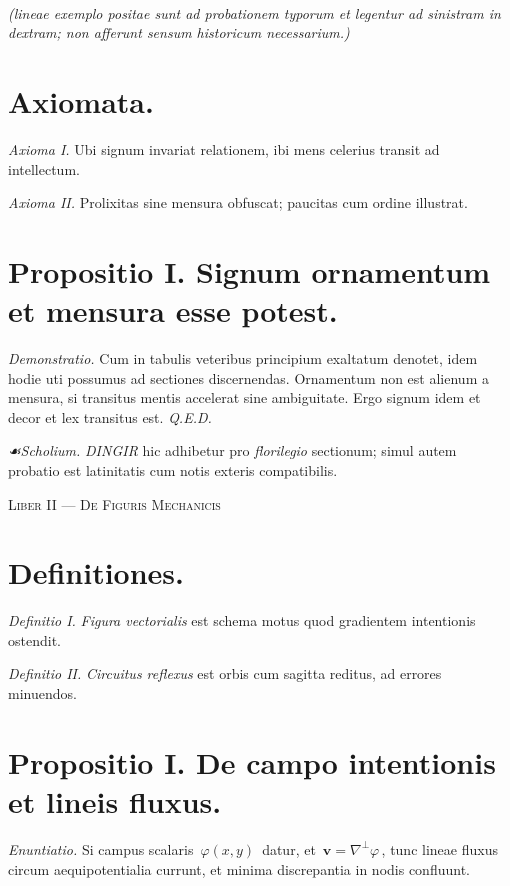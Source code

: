 \documentclass[12pt]{article}
\newcommand{\dingir}{\centerline{\Large \cunei{𒀭}}}
\newcommand{\scholia}{\textit{☙\;}}
\newcommand{\divider}{\vspace{1em}\dingir\vspace{1em}}
\newcommand{\Liber}[1]{\vspace{1ex}\begin{center}\Large\textsc{Liber #1}\end{center}\vspace{-0.5ex}\dingir\vspace{0.5ex}}
\begin{document}
\noindent {}\\
\textit{(lineae exemplo positae sunt ad probationem typorum et legentur ad sinistram in dextram; non afferunt sensum historicum necessarium.)}

\section*{Axiomata.}

\textit{Axioma I.} \; Ubi signum invariat relationem, ibi mens celerius transit ad intellectum.

\textit{Axioma II.} \; Prolixitas sine mensura obfuscat; paucitas cum ordine illustrat.

\section*{Propositio I. \; Signum  ornamentum et mensura esse potest.}

\textit{Demonstratio.} Cum  in tabulis veteribus principium exaltatum denotet, idem hodie uti possumus ad sectiones discernendas. Ornamentum non est alienum a mensura, si transitus mentis accelerat sine ambiguitate. Ergo signum idem et decor et lex transitus est. \textit{Q.E.D.}

\textit{\scholia Scholium.} \textit{DINGIR} hic adhibetur pro \textit{florilegio} sectionum; simul autem probatio est latinitatis cum notis exteris compatibilis.

\divider

\Liber{II — De Figuris Mechanicis}

\section*{Definitiones.}

\textit{Definitio I.} \; \textit{Figura vectorialis} est schema motus quod gradientem intentionis ostendit.

\textit{Definitio II.} \; \textit{Circuitus reflexus} est orbis cum sagitta reditus, ad errores minuendos.

\section*{Propositio I. \; De campo intentionis et lineis fluxus.}

\textit{Enuntiatio.} \; Si campus scalaris $\,\varphi(x,y)\,$ datur, et \,$\mathbf{v}=\nabla^\perp \varphi\,$, tunc lineae fluxus circum aequipotentialia currunt, et minima discrepantia in nodis confluunt.
\end{document}
